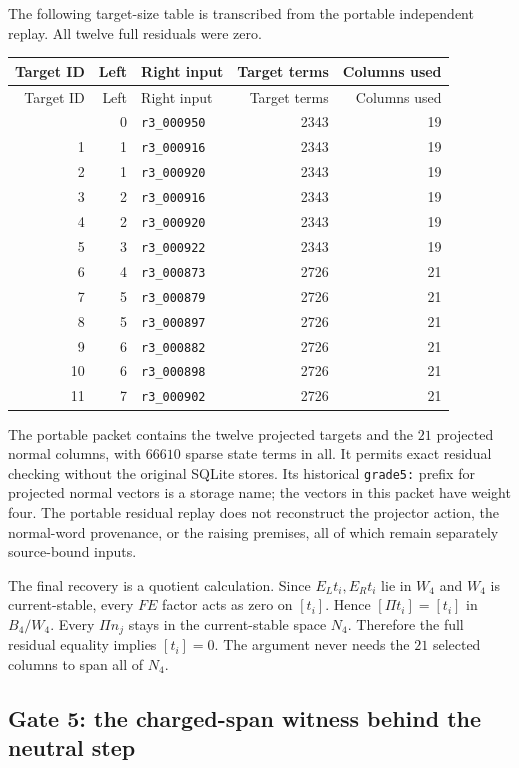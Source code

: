 The following target-size table is transcribed from the portable
independent replay. All twelve full residuals were zero.

\begin{longtable}{@{}rrlrr@{}}
\toprule Target ID&Left&Right input&Target terms&Columns used\\\midrule\endfirsthead
\toprule Target ID&Left&Right input&Target terms&Columns used\\\midrule\endhead
\bottomrule\endfoot
0 & 0 & \texttt{r3\_000950} & 2343 & 19\\
1 & 1 & \texttt{r3\_000916} & 2343 & 19\\
2 & 1 & \texttt{r3\_000920} & 2343 & 19\\
3 & 2 & \texttt{r3\_000916} & 2343 & 19\\
4 & 2 & \texttt{r3\_000920} & 2343 & 19\\
5 & 3 & \texttt{r3\_000922} & 2343 & 19\\
6 & 4 & \texttt{r3\_000873} & 2726 & 21\\
7 & 5 & \texttt{r3\_000879} & 2726 & 21\\
8 & 5 & \texttt{r3\_000897} & 2726 & 21\\
9 & 6 & \texttt{r3\_000882} & 2726 & 21\\
10 & 6 & \texttt{r3\_000898} & 2726 & 21\\
11 & 7 & \texttt{r3\_000902} & 2726 & 21\\
\end{longtable}
The portable packet contains the twelve projected targets and the
$21$ projected normal columns, with $66610$ sparse state terms in
all. It permits exact residual checking without the original SQLite
stores. Its historical \texttt{grade5:} prefix for projected normal
vectors is a storage name; the vectors in this packet have weight four.
The portable residual replay does not reconstruct the projector action,
the normal-word provenance, or the raising premises, all of which remain
separately source-bound inputs.

The final recovery is a quotient calculation. Since $E_Lt_i,E_Rt_i$
lie in $W_4$ and $W_4$ is current-stable, every $FE$ factor acts as
zero on $[t_i]$. Hence $[\Pi t_i]=[t_i]$ in $B_4/W_4$.
Every $\Pi n_j$ stays in the current-stable space $N_4$. Therefore
the full residual equality implies $[t_i]=0$. The argument never needs
the $21$ selected columns to span all of $N_4$.


\subsection{Gate 5: the charged-span witness behind the neutral step}
\label{expfinite:gate5-seeds}


